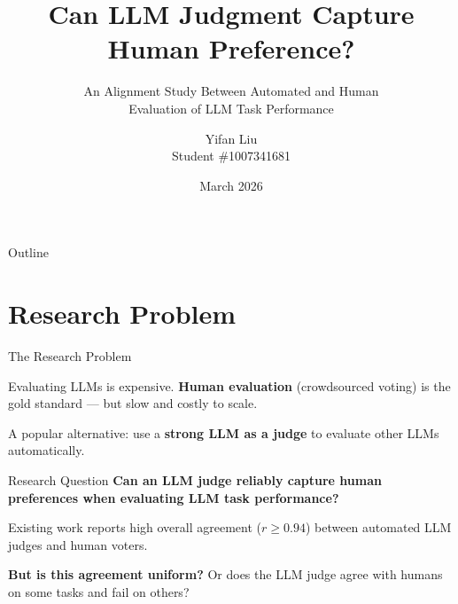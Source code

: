 \documentclass[aspectratio=169,11pt]{beamer}
\title[LLM Judgment vs Human Preference]{Can LLM Judgment Capture Human Preference?}
\subtitle{An Alignment Study Between Automated and Human\\Evaluation of LLM Task Performance}
\author[Yifan Liu]{Yifan Liu \\ {\small Student \#1007341681}}
\institute[UofT]{Department of Mechanical and Industrial Engineering\\University of Toronto}
\date{March 2026}
\begin{document}
\begin{frame}
\titlepage
\end{frame}

\begin{frame}{Outline}
\tableofcontents
\end{frame}

\section{Research Problem}

\begin{frame}{The Research Problem}

Evaluating LLMs is expensive. \textbf{Human evaluation} (crowdsourced voting) is the gold standard --- but slow and costly to scale.

\vspace{0.5em}
A popular alternative: use a \textbf{strong LLM as a judge} to evaluate other LLMs automatically.

\vspace{0.8em}
\begin{block}{Research Question}
\textbf{Can an LLM judge reliably capture human preferences when evaluating LLM task performance?}
\end{block}

\vspace{0.5em}
Existing work reports high overall agreement ($r \geq 0.94$) between automated LLM judges and human voters.

\vspace{0.5em}
\textbf{But is this agreement uniform?} Or does the LLM judge agree with humans on some tasks and fail on others?
\end{frame}
\end{document}
